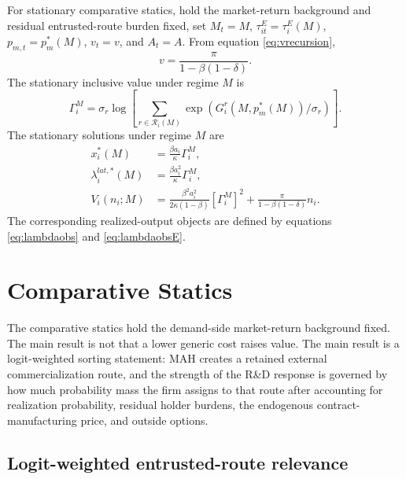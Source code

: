 \documentclass[12pt]{article}
\newcommand{\1}{\mathbf{1}}
\newcommand{\calR}{\mathcal{R}}
\begin{document}
For stationary comparative statics, hold the market-return background and residual entrusted-route burden fixed, set $M_t=M$, $\tau^E_{it}=\tau^E_i(M)$, $p_{m,t}=p_m^*(M)$, $v_t=v$, and $A_t=A$. From equation \eqref{eq:vrecursion},
\begin{equation}
    v=\frac{\pi}{1-\beta(1-\delta)}.
    \label{eq:vstationary}
\end{equation}
The stationary inclusive value under regime $M$ is
\begin{equation}
    \Gamma_i^M
    =
    \sigma_r
    \log
    \left[
    \sum_{r\in\calR_i(M)}
    \exp(G_i^r(M,p_m^*(M))/\sigma_r)
    \right].
    \label{eq:Gamma_stationary}
\end{equation}
The stationary solutions under regime $M$ are
\begin{align}
    x_i^*(M)&=\frac{\beta a_i}{\kappa}\Gamma_i^M,\label{eq:xstationary}\\
    \lambda_i^{lat,*}(M)&=\frac{\beta a_i^2}{\kappa}\Gamma_i^M,\label{eq:lambdastationary}\\
    V_i(n_i;M)&=\frac{\beta^2 a_i^2}{2\kappa(1-\beta)}\left[\Gamma_i^M\right]^2+\frac{\pi}{1-\beta(1-\delta)}n_i.\label{eq:Vstationary}
\end{align}
The corresponding realized-output objects are defined by equations \eqref{eq:lambdaobs} and \eqref{eq:lambdaobsE}.

\section{Comparative Statics}

The comparative statics hold the demand-side market-return background fixed. The main result is not that a lower generic cost raises value. The main result is a logit-weighted sorting statement: MAH creates a retained external commercialization route, and the strength of the R\&D response is governed by how much probability mass the firm assigns to that route after accounting for realization probability, residual holder burdens, the endogenous contract-manufacturing price, and outside options.

\subsection{Logit-weighted entrusted-route relevance}
\end{document}
